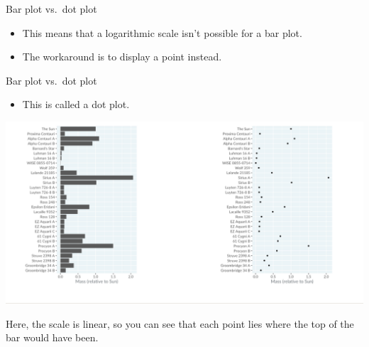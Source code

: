 \documentclass[
  ignorenonframetext,
]{beamer}
\providecommand{\tightlist}{%
  \setlength{\itemsep}{0pt}\setlength{\parskip}{0pt}}
\begin{document}
\begin{frame}{Bar plot vs.~dot plot}
\label{bar-plot-vs.-dot-plot-2}
\begin{itemize}
\item
  This means that a logarithmic scale isn't possible for a bar plot.
\item
  The workaround is to display a point instead.
\end{itemize}
\end{frame}

\begin{frame}{Bar plot vs.~dot plot}
\label{bar-plot-vs.-dot-plot-3}
\begin{itemize}
\tightlist
\item
  This is called a dot plot.
\end{itemize}

\includegraphics{../images/im60.png}

Here, the scale is linear, so you can see that each point lies where the
top of the bar would have been.
\end{frame}
\end{document}
